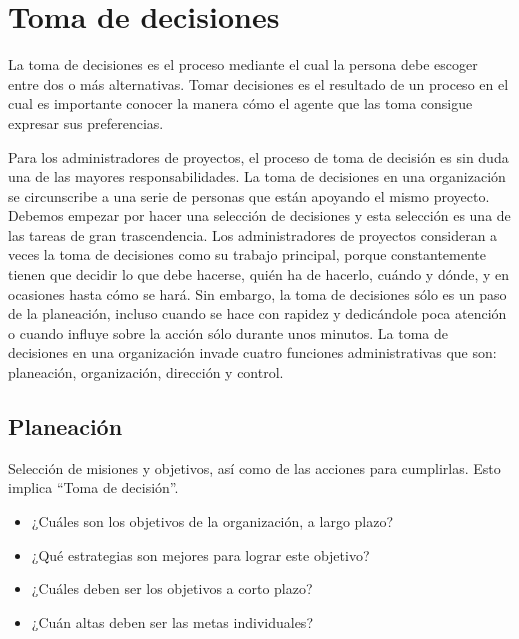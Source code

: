 \section{Toma de decisiones}
La toma de decisiones es el proceso mediante el cual la persona debe escoger entre dos o más alternativas. Tomar decisiones es el resultado de un proceso en el cual es importante conocer la manera cómo el agente que las toma consigue expresar sus preferencias.\cite{TomaDecisiones} 

Para los administradores de proyectos, el proceso de toma de decisión es sin duda una de las mayores responsabilidades. La toma de decisiones en una organización se circunscribe a una serie de personas que están apoyando el mismo proyecto. Debemos empezar por hacer una selección de decisiones y esta selección es una de las tareas de gran trascendencia. 
\newline \newline
Los administradores de proyectos consideran a veces la toma de decisiones como su trabajo principal, porque constantemente tienen que decidir lo que debe hacerse, quién ha de hacerlo, cuándo y dónde, y en ocasiones hasta cómo se hará. Sin embargo, la toma de decisiones sólo es un paso de la planeación, incluso cuando se hace con rapidez y dedicándole poca atención o cuando influye sobre la acción sólo durante unos minutos. 
\newline \newline
La toma de decisiones en una organización invade cuatro funciones administrativas que son: planeación, organización, dirección y control.\cite{TecnicasDecisiones}
\subsection{Planeación} 

Selección de misiones y objetivos, así como de las acciones para cumplirlas. Esto implica “Toma de decisión”.  

\begin{itemize}
\item ¿Cuáles son los objetivos de la organización, a largo plazo? 

\item ¿Qué estrategias son mejores para lograr este objetivo? 

\item ¿Cuáles deben ser los objetivos a corto plazo? 

\item ¿Cuán altas deben ser las metas individuales?

\end{itemize}
